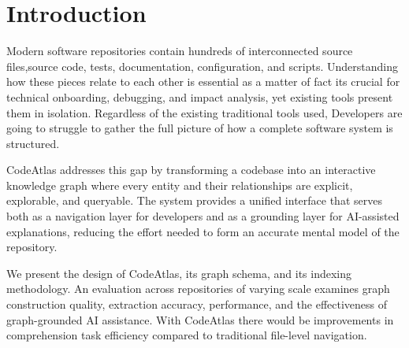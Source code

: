 \documentclass[conference]{IEEEtran}
\begin{document}
\section{Introduction}

Modern software repositories contain hundreds of interconnected source files,source code, tests, documentation, configuration, and scripts. Understanding how these pieces relate to each other is essential as a matter of fact its crucial for technical onboarding, debugging, and impact analysis, yet existing tools present them in isolation. Regardless of the existing traditional tools used, Developers are going to struggle to gather the full picture of how a complete software system is structured.

CodeAtlas addresses this gap by transforming a codebase into an interactive knowledge graph where every entity and their relationships are explicit, explorable, and queryable. The system provides a unified interface that serves both as a navigation layer for developers and as a grounding layer for AI-assisted explanations, reducing the effort needed to form an accurate mental model of the repository.

We present the design of CodeAtlas, its graph schema, and its indexing methodology. An evaluation across repositories of varying scale examines graph construction quality, extraction accuracy, performance, and the effectiveness of graph-grounded AI assistance. With CodeAtlas there would be improvements in comprehension task efficiency compared to traditional file-level navigation.

\end{document}
